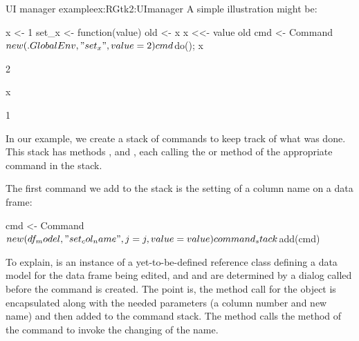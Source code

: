 \begin{example}{UI manager example}{ex:RGtk2:UImanager}
A simple illustration might be:
\begin{Schunk}
\begin{Sinput}
 x <- 1
 set_x <- function(value) {
   old <- x
   x <<- value
   old
 }
 cmd <- Command$new(.GlobalEnv, "set_x", value=2)
 cmd$do(); x
\end{Sinput}
\begin{Soutput}
[1] 2
\end{Soutput}
\end{Schunk}
\begin{Schunk}
\end{Schunk}
\begin{Schunk}
\begin{Sinput}
 x
\end{Sinput}
\begin{Soutput}
[1] 1
\end{Soutput}
\end{Schunk}

In our example, we create a stack of commands to keep track of what
was done. This stack has methods ,  and
, each calling the  or  method of the
appropriate command in the stack.

The first command we add to the stack is the setting of a column name
on a data frame:
\begin{Schunk}
\begin{Sinput}
 cmd <- Command$new(df_model, "set_col_name", j=j, value=value)
 command_stack$add(cmd)
\end{Sinput}
\end{Schunk}
%
To explain,  is an instance of a yet-to-be-defined
reference class defining a data model for the data frame being edited,
and  and  are determined by a dialog called before
the command is created. The point is, the method call for the
 object is encapsulated along with the needed
parameters (a column number and new name) and then added to the
command stack. The  method calls the  method of the
command to invoke the changing of the name.


\end{example}
